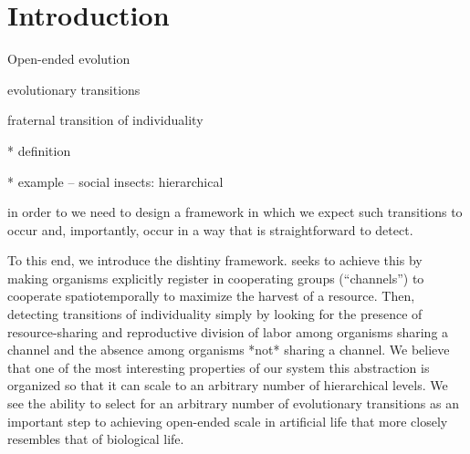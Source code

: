 \section{Introduction}

Open-ended evolution

evolutionary transitions

fraternal transition of individuality

* definition

* example -- social insects: hierarchical

in order to we need to design a framework in which we expect such transitions to occur and, importantly, occur in a way that is straightforward to detect.

To this end, we introduce the dishtiny framework.
seeks to achieve this by making organisms explicitly register in cooperating groups (``channels'') to cooperate spatiotemporally to maximize the harvest of a resource.
Then, detecting transitions of individuality simply by looking for the presence of resource-sharing and reproductive division of labor among organisms sharing a channel and the absence among organisms *not* sharing a channel.
We believe that one of the most interesting properties of our system this abstraction is organized so that it can scale to an arbitrary number of hierarchical levels.
We see the ability to select for an arbitrary number of evolutionary transitions as an important step to achieving open-ended scale in artificial life that more closely resembles that of biological life. 
